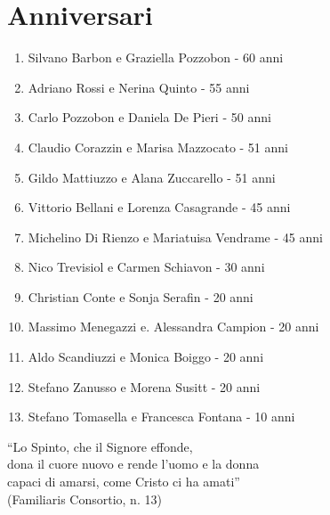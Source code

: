\section{Anniversari}

\begin{enumerate}
  \item Silvano Barbon e Graziella Pozzobon - 60 anni
  \item Adriano Rossi e Nerina Quinto - 55 anni
  \item Carlo Pozzobon e Daniela De Pieri - 50 anni
  \item Claudio Corazzin e Marisa Mazzocato - 51 anni
  \item Gildo Mattiuzzo e Alana Zuccarello - 51 anni
  \item Vittorio Bellani e Lorenza Casagrande - 45 anni
  \item Michelino Di Rienzo e Mariatuisa Vendrame - 45 anni
  \item Nico Trevisiol e Carmen Schiavon - 30 anni
  \item Christian Conte e Sonja Serafin - 20 anni
  \item Massimo Menegazzi e. Alessandra Campion - 20 anni
  \item Aldo Scandiuzzi e Monica Boiggo - 20 anni
  \item Stefano Zanusso e Morena Susitt - 20 anni
  \item Stefano Tomasella e Francesca Fontana - 10 anni
\end{enumerate}

``Lo Spinto, che il Signore effonde,\\
dona il cuore nuovo e rende l'uomo e la donna\\
capaci di amarsi, come Cristo ci ha amati''\\
(Familiaris Consortio, n. 13)
